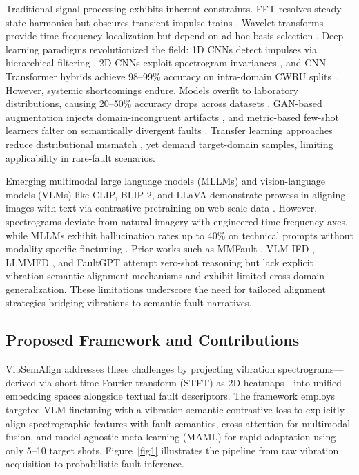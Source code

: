 Traditional signal processing exhibits inherent constraints. FFT resolves steady-state harmonics but obscures transient impulse trains \cite{cite10}. Wavelet transforms provide time-frequency localization but depend on ad-hoc basis selection \cite{cite11}. Deep learning paradigms revolutionized the field: 1D CNNs detect impulses via hierarchical filtering \cite{cite12}, 2D CNNs exploit spectrogram invariances \cite{cite13}, and CNN-Transformer hybrids achieve 98--99\% accuracy on intra-domain CWRU splits \cite{cite15}. However, systemic shortcomings endure. Models overfit to laboratory distributions, causing 20--50\% accuracy drops across datasets \cite{cite17}. GAN-based augmentation injects domain-incongruent artifacts \cite{cite18}, and metric-based few-shot learners falter on semantically divergent faults \cite{cite19}. Transfer learning approaches reduce distributional mismatch \cite{cite25}, yet demand target-domain samples, limiting applicability in rare-fault scenarios.

Emerging multimodal large language models (MLLMs) and vision-language models (VLMs) like CLIP, BLIP-2, and LLaVA demonstrate prowess in aligning images with text via contrastive pretraining on web-scale data \cite{cite20}\cite{cite21}. However, spectrograms deviate from natural imagery with engineered time-frequency axes, while MLLMs exhibit hallucination rates up to 40\% on technical prompts without modality-specific finetuning \cite{cite27}\cite{cite28}\cite{cite29}. Prior works such as MMFault \cite{cite23}, VLM-IFD \cite{cite24}, LLMMFD \cite{cite25}, and FaultGPT \cite{cite26} attempt zero-shot reasoning but lack explicit vibration-semantic alignment mechanisms and exhibit limited cross-domain generalization. These limitations underscore the need for tailored alignment strategies bridging vibrations to semantic fault narratives.

\subsection{Proposed Framework and Contributions}

VibSemAlign addresses these challenges by projecting vibration spectrograms---derived via short-time Fourier transform (STFT) as 2D heatmaps---into unified embedding spaces alongside textual fault descriptors. The framework employs targeted VLM finetuning with a vibration-semantic contrastive loss to explicitly align spectrographic features with fault semantics, cross-attention for multimodal fusion, and model-agnostic meta-learning (MAML) for rapid adaptation using only 5--10 target shots. Figure~\ref{fig1} illustrates the pipeline from raw vibration acquisition to probabilistic fault inference.

